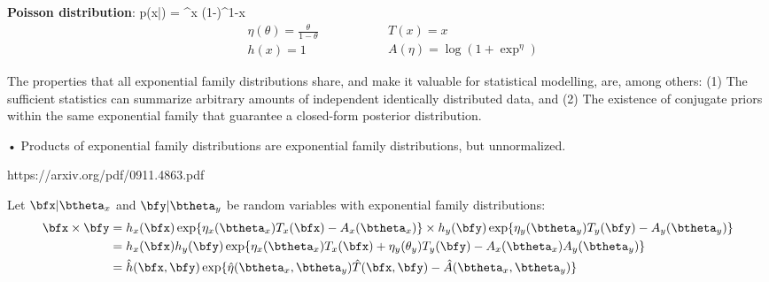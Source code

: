 \textbf{Poisson distribution}:
\beq
p(x|\theta) = \theta^x (1-\theta)^{1-x}
\eeq
\begin{equation}
\begin{split}
& \eta(\theta) = \frac{\theta}{1-\theta} \\
& h(x) = 1
\end{split}
\qquad \qquad
\begin{split}
& T(x) = x \\
& A(\eta) = \log(1+\exp^\eta)
\end{split}
\end{equation}

The properties that all exponential family distributions share, and make it valuable for statistical modelling, are, among others: (1) The sufficient statistics can summarize arbitrary amounts of independent identically distributed data, and (2) The existence of conjugate priors within the same exponential family that guarantee a closed-form posterior distribution. 

• Products of exponential family distributions are exponential family distributions, but unnormalized.

https://arxiv.org/pdf/0911.4863.pdf

Let $\bfx | \btheta_x$ and $\bfy | \btheta_y$ be random variables with exponential family distributions:
\begin{align}
	\bfx \times \bfy &= 
	h_x(\bfx) \exp \{ \eta_x(\btheta_x) T_x(\bfx) - A_x(\btheta_x) \} \times h_y(\bfy) \exp \{ \eta_y(\btheta_y) T_y(\bfy) - A_y(\btheta_y) \} \\
	&= h_x(\bfx) h_y(\bfy) \exp \{ \eta_x(\btheta_x) T_x(\bfx) + \eta_y(\theta_y) T_y(\bfy) - A_x(\btheta_x) A_y(\btheta_y) \} \\
	&= \hat{h}(\bfx,\bfy) \exp \{ \hat{\eta}(\btheta_x,\btheta_y) \hat{T}(\bfx,\bfy) - \hat{A}(\btheta_x, \btheta_y) \}
\end{align}


